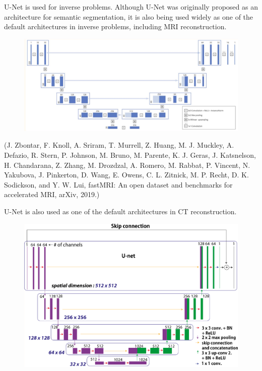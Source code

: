 \begin{frame}[allowframebreaks]

\begin{myconceptblock}{8.29}{U-Net is used for inverse problems.}
    Although U-Net was originally proposed as an architecture for semantic segmentation, it is also being used widely as one of the default architectures in inverse problems, including MRI reconstruction.

    \begin{figure}[H]
        \centering
        \includegraphics[width=1.0\textwidth]{.././assets/8.27.jpg}
    \end{figure}

    (J. Zbontar, F. Knoll, A. Sriram, T. Murrell, Z. Huang, M. J. Muckley, A. Defazio, R. Stern, P. Johnson, M. Bruno, M. Parente, K. J. Geras, J. Katsnelson, H. Chandarana, Z. Zhang, M. Drozdzal, A. Romero, M. Rabbat, P. Vincent, N. Yakubova, J. Pinkerton, D. Wang, E. Owens, C. L. Zitnick, M. P. Recht, D. K. Sodickson, and Y. W. Lui, fastMRI: An open dataset and benchmarks for accelerated MRI, arXiv, 2019.)

    \par\noindent\textcolor{gray}{\hdashrule{\textwidth}{0.4pt}{1pt 2pt}}

    U-Net is also used as one of the default architectures in CT reconstruction.

    \begin{figure}[H]
        \centering
        \includegraphics[width=1.0\textwidth]{.././assets/8.28.png}
    \end{figure}


\end{myconceptblock}
\end{frame}
